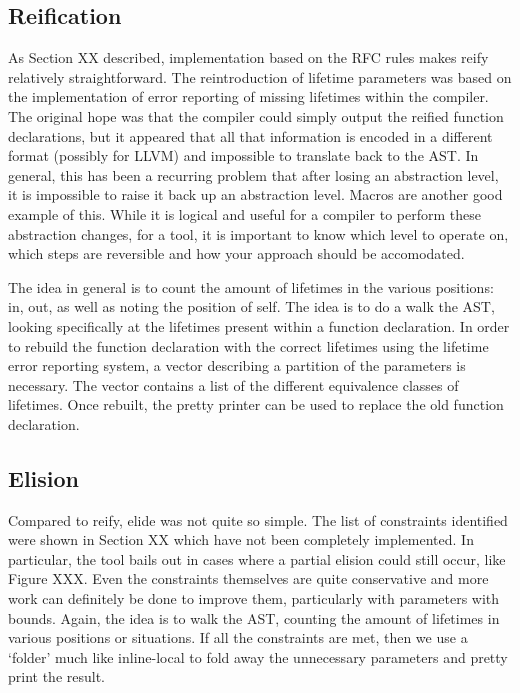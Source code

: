 \subsection{Reification}
As Section XX described, implementation based on the RFC rules makes reify relatively straightforward. The reintroduction of lifetime parameters was based on the implementation of error reporting of missing lifetimes within the compiler. The original hope was that the compiler could simply output the reified function declarations, but it appeared that all that information is encoded in a different format (possibly for LLVM) and impossible to translate back to the AST. In general, this has been a recurring problem that after losing an abstraction level, it is impossible to raise it back up an abstraction level. Macros are another good example of this. While it is logical and useful for a compiler to perform these abstraction changes, for a tool, it is important to know which level to operate on, which steps are reversible and how your approach should be accomodated.

The idea in general is to count the amount of lifetimes in the various positions: in, out, as well as noting the position of self. The idea is to do a walk the AST, looking specifically at the lifetimes present within a function declaration. In order to rebuild the function declaration with the correct lifetimes using the lifetime error reporting system, a vector describing a partition of the parameters is necessary. The vector contains a list of the different equivalence classes of lifetimes. Once rebuilt, the pretty printer can be used to replace the old function declaration.

\subsection{Elision}

Compared to reify, elide was not quite so simple. The list of constraints identified were shown in Section XX which have not been completely implemented. In particular, the tool bails out in cases where a partial elision could still occur, like Figure XXX. Even the constraints themselves are quite conservative and more work can definitely be done to improve them, particularly with parameters with bounds. Again, the idea is to walk the AST, counting the amount of lifetimes in various positions or situations. If all the constraints are met, then we use a `folder' much like inline-local to fold away the unnecessary parameters and pretty print the result.


